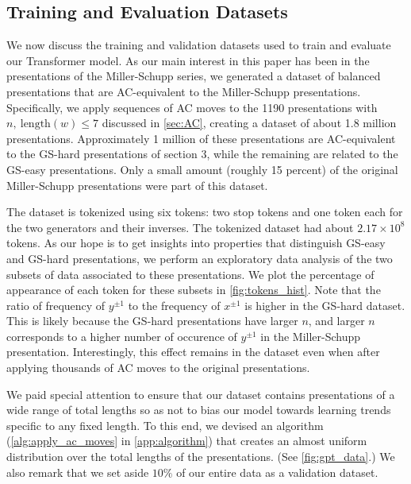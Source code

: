\subsection{Training and Evaluation Datasets\label{sec:transformer_datasets}}

We now discuss the training and validation datasets used to train and evaluate our Transformer model. As our main interest in this paper has been in the presentations of the Miller-Schupp series, we generated a dataset of balanced presentations that are AC-equivalent to the Miller-Schupp presentations. Specifically, we apply sequences of AC moves to the 1190 presentations with $n,\ \text{length}(w) \leq 7$ discussed in \autoref{sec:AC}, creating a dataset of about 1.8 million presentations. Approximately 1 million of these presentations are AC-equivalent to the GS-hard presentations of section 3, while the remaining are related to the GS-easy presentations. 
Only a small amount (roughly 15 percent) of the original Miller-Schupp presentations were part of this dataset.

The dataset is tokenized using six tokens: two stop tokens and one token each for the two generators and their inverses. The tokenized dataset had about $2.17 \times 10^8$ tokens. As our hope is to get insights into properties that distinguish GS-easy and GS-hard presentations, we perform an exploratory data analysis of the two subsets of data associated to these presentations. We plot the percentage of appearance of each token for these subsets in \autoref{fig:tokens_hist}. 
Note that the ratio of frequency of $y^{\pm 1}$ to the frequency of $x^{\pm 1}$ is higher in the GS-hard dataset. This is likely because the GS-hard presentations have larger $n$, and larger $n$ corresponds to a higher number of occurence of $y^{\pm 1}$ in the Miller-Schupp presentation. Interestingly, this effect remains in the dataset even when after applying thousands of AC moves to the original presentations.

We paid special attention to ensure that our dataset contains presentations of a wide range of total lengths so as not to bias our model towards learning trends specific to any fixed length. To this end, we devised an algorithm (\autoref{alg:apply_ac_moves} in \autoref{app:algorithm}) that creates an almost uniform distribution over the total lengths of the presentations. (See \autoref{fig:gpt_data}.) We also remark that we set aside $10\%$ of our entire data as a validation dataset.

